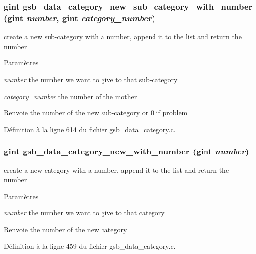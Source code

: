 \subsubsection[{gsb\_\-data\_\-category\_\-new\_\-sub\_\-category\_\-with\_\-number}]{\setlength{\rightskip}{0pt plus 5cm}gint gsb\_\-data\_\-category\_\-new\_\-sub\_\-category\_\-with\_\-number (gint {\em number}, \/  gint {\em category\_\-number})}\label{gsb__data__category_8h_a007e82a8aede52e25cabd4525cdd75af}
create a new sub-\/category with a number, append it to the list and return the number


\begin{DoxyParams}{Paramètres}
\item[{\em number}]the number we want to give to that sub-\/category \item[{\em category\_\-number}]the number of the mother\end{DoxyParams}
\begin{DoxyReturn}{Renvoie}
the number of the new sub-\/category or 0 if problem 
\end{DoxyReturn}


Définition à la ligne 614 du fichier gsb\_\-data\_\-category.c.

\subsubsection[{gsb\_\-data\_\-category\_\-new\_\-with\_\-number}]{\setlength{\rightskip}{0pt plus 5cm}gint gsb\_\-data\_\-category\_\-new\_\-with\_\-number (gint {\em number})}\label{gsb__data__category_8h_af1200f47ea735940d984eff24c5c41ef}
create a new category with a number, append it to the list and return the number


\begin{DoxyParams}{Paramètres}
\item[{\em number}]the number we want to give to that category\end{DoxyParams}
\begin{DoxyReturn}{Renvoie}
the number of the new category 
\end{DoxyReturn}


Définition à la ligne 459 du fichier gsb\_\-data\_\-category.c.

